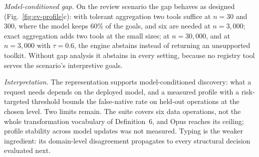 \emph{Model-conditioned gap.} On the review scenario the gap behaves as designed (Fig.~\ref{fig:ev-profile}c):
with tolerant aggregation two tools suffice at $n=30$ and 300, where the model keeps 60\% of the goals, and six
are needed at $n=3{,}000$; exact aggregation adds two tools at the small sizes; at $n=30{,}000$, and at
$n=3{,}000$ with $\tau=0.6$, the engine abstains instead of returning an unsupported toolkit. Without gap
analysis it abstains in every setting, because no registry tool serves the scenario's interpretive goals.

\emph{Interpretation.} The representation supports model-conditioned discovery: what a request needs depends on
the deployed model, and a measured profile with a risk-targeted threshold bounds the false-native rate on held-out
operations at the chosen level. Two limits remain. The suite covers six data operations, not the whole
transformation vocabulary of Definition~6, and Opus reaches its ceiling; profile stability across model updates
was not measured. Typing is the weaker ingredient: its domain-level disagreement propagates to every structural
decision evaluated next.
